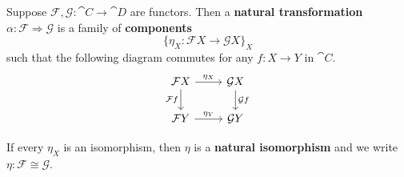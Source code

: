 \documentclass[twoside,10pt]{report}
\begin{document}
\begin{defn}
Suppose $\mathcal{F},\mathcal{G}:\cat{C}\to \cat{D}$ are functors. Then a \textbf{natural transformation} $\alpha:\mathcal{F}\Rightarrow \mathcal{G}$ is a family of \textbf{components}
\[
	\{ \eta_X: \mathcal{F}X \to \mathcal{G}X\}_X
\] such that the following diagram commutes for any $f:X\to Y$ in $\cat{C}$.
\[
\begin{tikzcd}
	\mathcal{F}X \rar{\eta_{X}} \arrow[d, "\mathcal{F}f"'] & \mathcal{G}X \dar{\mathcal{G}f} \\
	\mathcal{F}Y \rar{\eta_{Y}} & \mathcal{G}Y
\end{tikzcd}
\] 
\end{defn}
If every $\eta_{X}$ is an isomorphism, then $\eta$ is a \textbf{natural isomorphism} and we write $\eta: \mathcal{F} \cong \mathcal{G}$.
\end{document}
